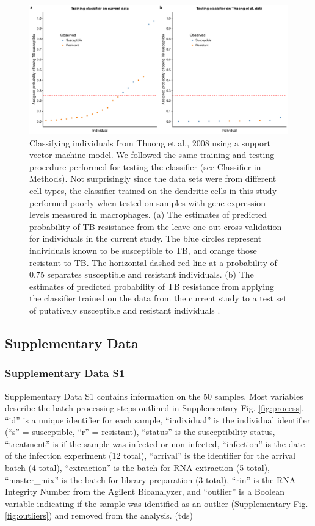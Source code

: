 \documentclass[fleqn,10pt]{wlscirep}
\begin{document}
\begin{figure}[ht]
\centering
\includegraphics[width=\linewidth]{../figure/classifier-svm-thuong.pdf}
\caption{
Classifying individuals from Thuong et al., 2008\cite{Thuong2008}
using a support vector machine model. We followed the same training
and testing procedure performed for testing the classifier (see
Classifier in Methods). Not surprisingly since the data sets were from
different cell types, the classifier trained on the dendritic cells in
this study performed poorly when tested on samples with gene
expression levels measured in macrophages. (a) The estimates of
predicted probability of TB resistance from the
leave-one-out-cross-validation for individuals in the current study.
The blue circles represent individuals known to be susceptible to TB,
and orange those resistant to TB. The horizontal dashed red line at a
probability of 0.75 separates susceptible and resistant individuals.
(b) The estimates of predicted probability of TB resistance from
applying the classifier trained on the data from the current study to
a test set of putatively susceptible and resistant individuals
\cite{Thuong2008}.
}
\label{fig:class-svm-thuong}
\end{figure}
\clearpage\newpage
\subsection*{Supplementary Data}

\subsubsection*{Supplementary Data S1}

Supplementary Data S1 contains information on the 50 samples. Most
variables describe the batch processing steps outlined in
Supplementary Fig. \ref{fig:process}. “id” is a unique identifier for
each sample, “individual” is the individual identifier (“s” =
susceptible, “r” = resistant), “status” is the susceptibility status,
“treatment” is if the sample was infected or non-infected, “infection”
is the date of the infection experiment (12 total), “arrival” is the
identifier for the arrival batch (4 total), “extraction” is the batch
for RNA extraction (5 total), “master\_mix” is the batch for library
preparation (3 total), “rin” is the RNA Integrity Number from the
Agilent Bioanalyzer, and “outlier” is a Boolean variable indicating if
the sample was identified as an outlier (Supplementary Fig.
\ref{fig:outliers}) and removed from the analysis. (tds)
\end{document}
